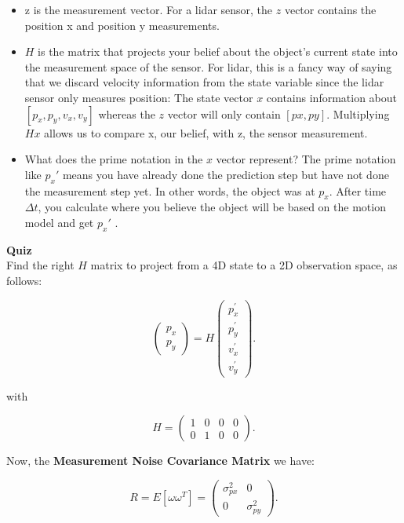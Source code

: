 \documentclass[11pt, a4paper]{article}
\begin{document}
\begin{itemize}
	\item z is the measurement vector. For a lidar sensor, the $z$ vector contains the position x and position y measurements.
	\item $H$ is the matrix that projects your belief about the object's current state into the measurement space of the sensor. For lidar, this is a fancy way of saying that we discard velocity information from the state variable since the lidar sensor only measures position: The state vector $x$ contains information about $[p_x, p_y, v_x, v_y]$ whereas the $z$ vector will only contain $[px, py]$. Multiplying $Hx$ allows us to compare x, our belief, with z, the sensor measurement.
	\item What does the prime notation in the $x$ vector represent? The prime notation like $p_x'$ means you have already done the prediction step but have not done the measurement step yet. In other words, the object was at $p_x$. After time $\Delta{t}$, you calculate where you believe the object will be based on the motion model and get $p_x'$ .
\end{itemize}


\textbf{Quiz}\\

Find the right $H$ matrix to project from a 4D state to a 2D observation space, as follows:


\[
\left(\begin{array}{c}{p_{x}} \\ {p_{y}}\end{array}\right)=H\left(\begin{array}{c}{p_{x}^{\prime}} \\ {p_{y}^{\prime}} \\ {v_{x}^{\prime}} \\ {v_{y}^{\prime}}\end{array}\right)
.\] 

with 

\[
H=\left(\begin{array}{llll}{1} & {0} & {0} & {0} \\ {0} & {1} & {0} & {0}\end{array}\right)
.\] 


Now, the \textbf{Measurement Noise Covariance Matrix} we have:

\[
R=E\left[\omega \omega^{T}\right]=\left(\begin{array}{cc}{\sigma_{p x}^{2}} & {0} \\ {0} & {\sigma_{p y}^{2}}\end{array}\right)
.\] 
\end{document}
